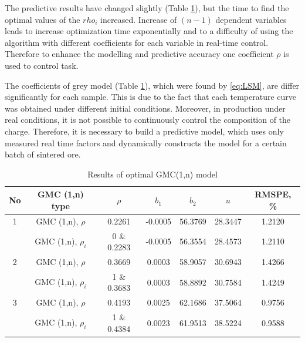 \documentclass[AMS,STIX2COL]{WileyNJD-v2}
\begin{document}
The predictive results have changed slightly (Table \ref{tab:OGMC}), but the time to find the optimal values of the $rho_i$ increased. Increase of $(n-1)$ dependent variables leads to increase optimization time exponentially and to a difficulty of using the algorithm with different coefficients for each variable in real-time control. Therefore to enhance the modelling and predictive accuracy one coefficient $\rho$ is used to control task.

The coefficients of grey model (Table \ref{tab:OGMC}), which were found by \eqref{eq:LSM}, are differ significantly for each sample. This is due to the fact that each temperature curve was obtained under different initial conditions. Moreover, in production under real conditions, it is not possible to continuously control the composition of the charge. Therefore, it is necessary to build a predictive model, which uses only measured real time factors and dynamically constructs the model for a certain batch of sintered ore. 

\begin{table}[htbp]
	\caption{Results of optimal GMC(1,n) model}
	\begin{center}
		\begin{tabular*}{500pt}{@{\extracolsep\fill}ccccccc@{\extracolsep\fill}}
			\toprule
			\textbf{No} & \textbf{GMC (1,n) type} &\textbf{$\rho$} & \textbf{$b_1$}  & \textbf{$b_2$} &\textbf{$u$} & \textbf{RMSPE, \%}\\
			\midrule
			1&GMC (1,n), $\rho$& 0.2261 & -0.0005 & 56.3769 & 28.3447 & 1.2120 \\
			&GMC (1,n), $\rho_i$ & 0 \& 0.2283 & -0.0005 & 56.3554 & 28.4573 & 1.2110 \\
			\midrule
			2& GMC (1,n), $\rho$ & 0.3669 & 0.0003 & 58.9057 & 30.6943 & 1.4266 \\
			&GMC (1,n), $\rho_i$ & 1 \& 0.3683 & 0.0003 & 58.8892 & 30.7584 & 1.4249 \\
			\midrule
			3&GMC (1,n), $\rho$& 0.4193 & 0.0025 & 62.1686 & 37.5064 & 0.9756 \\		
			&GMC (1,n), $\rho_i$ & 1 \& 0.4384 & 0.0023 & 61.9513 & 38.5224 & 0.9588 \\
			\bottomrule
		\end{tabular*}
		\label{tab:OGMC}
	\end{center}
\end{table}
\end{document}

